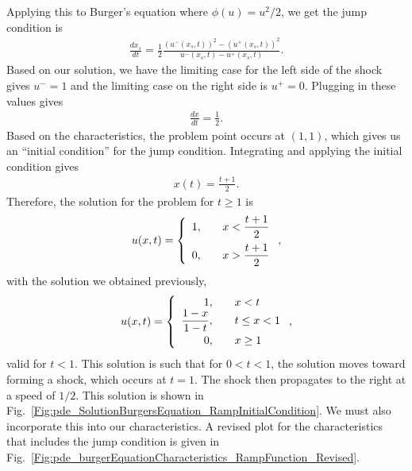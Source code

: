 Applying this to Burger's equation where $\phi(u) = u^2/2$, we get the jump condition is
\begin{align}
  \frac{dx_s}{dt} = \frac{1}{2} \frac{ (u^-(x_s,t))^2 - (u^+(x_s,t))^2 }{ u^-(x_s,t) - u^+(x_s,t) } .
\end{align}
Based on our solution, we have the limiting case for the left side of the shock gives $u^- = 1$ and the limiting case on the right side is $u^+ = 0$. Plugging in these values gives
\begin{align}
  \frac{dx}{dt} = \frac{1}{2} .
\end{align}
Based on the characteristics, the problem point occurs at $(1,1)$, which gives us an ``initial condition'' for the jump condition. Integrating and applying the initial condition gives
\begin{align}
  x(t) = \frac{ t + 1 }{ 2 }.
\end{align}
Therefore, the solution for the problem for $t \ge 1$ is
\begin{align}
  u(x,t) = \left\{ \begin{array}{r l}
  1, & \quad  x < \dfrac{t + 1}{2} \vspace{0.2cm} \\
  0, & \quad  x > \dfrac{t + 1}{2} \\ \end{array} \right. ,
\end{align}
with the solution we obtained previously,
\begin{align}
  u(x,t) = \left\{ \begin{array}{r l} 
  1, & \quad x < t \\
  \dfrac{1 - x}{1 - t}, & \quad t \le x < 1 \vspace{0.2em} \\
  0, & \quad x \ge 1 \\ \end{array} \right. , \nonumber
\end{align}
valid for $t < 1$. This solution is such that for $0 < t < 1$, the solution moves toward forming a shock, which occurs at $t = 1$. The shock then propagates to the right at a speed of $1/2$. This solution is shown in Fig.~\ref{Fig:pde_SolutionBurgersEquation_RampInitialCondition}. We must also incorporate this into our characteristics. A revised plot for the characteristics that includes the jump condition is given in Fig.~\ref{Fig:pde_burgerEquationCharacteristics_RampFunction_Revised}.


